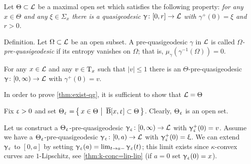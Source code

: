 Let $\Theta\subset \spc{L}$ be a maximal open set which satisfies the following property:
\textit{for any $x\in \Theta$ and any $\xi\in\Sigma_x$ there is a quasigeodesic $\gamma\:[0,r]\to \spc{L}$ with $\gamma^+(0)=\xi$ and $r>0$.}

\begin{clm}{Definition.}
Let $\Omega\subset \spc{L}$ be an open subset. 
A pre-quasigeodesic $\gamma$ in $\mathcal{L}$ is called \emph{$\Omega$-pre-quasigeodesic} if  its
entropy vanishes on $\Omega$; 
that is, $\mu_\gamma(\gamma^{-1}(\Omega))=0$.
\end{clm}

\begin{clm}{}\label{clm:loc-exist} For any $x\in \spc{L}$  and any $v\in \T_x$ such that $|v|\le 1$ there is an $\Theta$-pre-quasigeodesic $\gamma\:[0,\infty)\to \spc{L}$ with $\gamma^+(0)=v$.
\end{clm}

\begin{clm}{}\label{clm:suff-qg-exist} In order to prove \ref{thm:exist-qg}, it is sufficient to show that $\mathcal{L}=\Theta$
\end{clm}

Fix $\upvarepsilon>0$ and set
$\Theta_\eps
=
\set{x\in\Theta}{\cBall[x,\eps]\subset\Theta}$.
Clearly, $\Theta_\upvarepsilon$ is an open set.

Let us construct a $\Theta_\upvarepsilon$-pre-quasigeodesic $\gamma_\eps\:[0,\infty)\to \spc{L}$ with $\upgamma_\upvarepsilon^+(0)=v$.
Assume we have a $\Theta_\upvarepsilon$-pre-quasigeodesic $\gamma_\eps\:[0,a)\to \spc{L}$  with $\upgamma_\upvarepsilon^+(0)=\upxi$.
We can extend $\upgamma_\upvarepsilon$ to $[0,a]$ by setting $\gamma_\eps(a)=\lim_{t\to a-}\gamma_\eps(t)$;
this limit exists since $\kappa$-convex curves are $1$-Lipschitz, see \ref{thm:k-conc=lip-lip}
(if $a=0$ set $\upgamma_\upvarepsilon(0)=x$).

